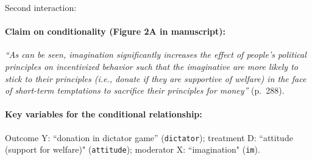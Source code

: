 \documentclass[12pt]{article}
\begin{document}
\clearpage


\noindent Second interaction:

\paragraph{Claim on conditionality (Figure 2A in manuscript):} \emph{``As can be seen, imagination significantly increases the effect of people's political principles on incentivized behavior such that the imaginative are more likely to stick to their principles (i.e., donate if they are supportive of welfare) in the face of short-term temptations to sacrifice their principles for money''} (p.\ 288). 



\paragraph{Key variables for the conditional relationship:} Outcome Y:
``donation in dictator game'' (\texttt{dictator}); treatment D: ``attitude (support for welfare)" (\texttt{attitude}); moderator X: ``imagination"
(\texttt{im}).

\newpage
\end{document}
